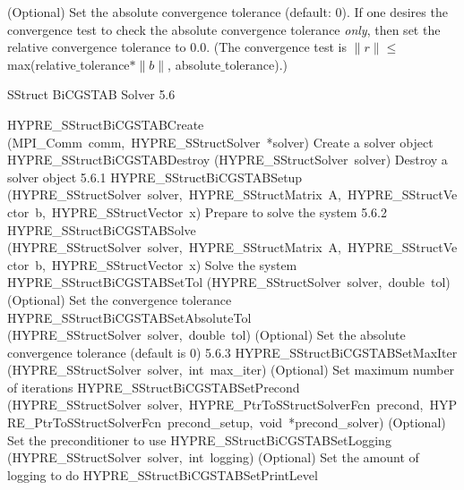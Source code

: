\documentclass{article}
\begin{document}
\begin{cxxentry}
\begin{cxxentry}
\begin{cxxfunction}
\begin{cxxdoc}
(Optional) Set the absolute convergence tolerance  (default: 0).
If one desires
the convergence test to check the absolute convergence tolerance {\it only}, then
set the relative convergence tolerance to 0.0.  (The convergence test is 
$\|r\| \leq$ max(relative$\_$tolerance$\ast \|b\|$, absolute$\_$tolerance).)
\end{cxxdoc}
\end{cxxfunction}
\end{cxxentry}
\begin{cxxentry}
{}
        {SStruct BiCGSTAB Solver}
        {}
        {
}
        {5.6}
\begin{cxxnames}
        {HYPRE\_SStructBiCGSTABCreate}
        {(MPI\_Comm\ comm,\ HYPRE\_SStructSolver\ *solver)}
        {
Create a solver object}
        {}
\label{cxx.5.6.4}
        {HYPRE\_SStructBiCGSTABDestroy}
        {(HYPRE\_SStructSolver\ solver)}
        {
Destroy a solver object}
        {5.6.1}
        {HYPRE\_SStructBiCGSTABSetup}
        {(HYPRE\_SStructSolver\ solver,\ HYPRE\_SStructMatrix\ A,\ HYPRE\_SStructVector\ b,\ HYPRE\_SStructVector\ x)}
        {
Prepare to solve the system}
        {5.6.2}
        {HYPRE\_SStructBiCGSTABSolve}
        {(HYPRE\_SStructSolver\ solver,\ HYPRE\_SStructMatrix\ A,\ HYPRE\_SStructVector\ b,\ HYPRE\_SStructVector\ x)}
        {
Solve the system}
        {}
\label{cxx.5.6.5}
        {HYPRE\_SStructBiCGSTABSetTol}
        {(HYPRE\_SStructSolver\ solver,\ double\ tol)}
        {
(Optional) Set the convergence tolerance}
        {}
\label{cxx.5.6.6}
        {HYPRE\_SStructBiCGSTABSetAbsoluteTol}
        {(HYPRE\_SStructSolver\ solver,\ double\ tol)}
        {
(Optional) Set the absolute convergence tolerance (default is 0)}
        {5.6.3}
        {HYPRE\_SStructBiCGSTABSetMaxIter}
        {(HYPRE\_SStructSolver\ solver,\ int\ max\_iter)}
        {
(Optional) Set maximum number of iterations}
        {}
\label{cxx.5.6.7}
        {HYPRE\_SStructBiCGSTABSetPrecond}
        {(HYPRE\_SStructSolver\ solver,\ HYPRE\_PtrToSStructSolverFcn\ precond,\ HYPRE\_PtrToSStructSolverFcn\ precond\_setup,\ void\ *precond\_solver)}
        {
(Optional) Set the preconditioner to use}
        {}
\label{cxx.5.6.8}
        {HYPRE\_SStructBiCGSTABSetLogging}
        {(HYPRE\_SStructSolver\ solver,\ int\ logging)}
        {
(Optional) Set the amount of logging to do}
        {}
\label{cxx.5.6.9}
        {HYPRE\_SStructBiCGSTABSetPrintLevel}

\end{cxxnames}
\end{cxxentry}
\end{cxxentry}
\end{document}
